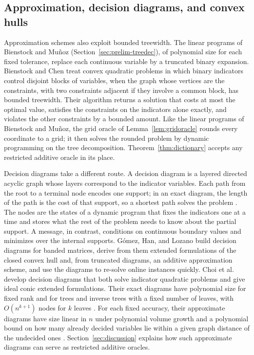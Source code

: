 \subsection{Approximation, decision diagrams, and convex hulls}
Approximation schemes also exploit bounded treewidth. The linear
programs of Bienstock and Mu\~noz \cite{BienstockMunoz}
(Section~\ref{sec:prelim-treedec}), of polynomial size for each fixed
tolerance, replace each continuous variable by a truncated binary
expansion. Bienstock and Chen \cite[Theorem~1.4]{BienstockChen} treat
convex quadratic problems in which binary indicators control disjoint
blocks of variables, when the graph whose vertices are the constraints,
with two constraints adjacent if they involve a common block, has
bounded treewidth. Their algorithm returns a solution that costs at
most the optimal value, satisfies the constraints on the indicators
alone exactly, and violates the other constraints by a bounded amount.
Like the linear programs of Bienstock and Mu\~noz, the grid oracle of
Lemma~\ref{lem:gridoracle} rounds every coordinate to a grid; it then
solves the rounded problem by dynamic programming on the tree
decomposition.
Theorem~\ref{thm:dictionary} accepts any restricted additive oracle in
its place.

Decision diagrams take a different route. A decision diagram is a
layered directed acyclic graph whose layers correspond to the indicator
variables. Each path from the root to a terminal node encodes one
support; in an exact diagram, the length of the path is the cost of that
support, so a shortest path solves the problem
\cite[Section~2.1]{GomezBanded}. The nodes are the states of a dynamic
program that fixes the indicators one at a time and stores what the rest
of the problem needs to know about the partial support. A message, in
contrast, conditions on continuous boundary values and minimizes over
the internal supports. G\'omez, Han, and Lozano \cite{GomezBanded} build
decision diagrams for banded matrices, derive from them extended
formulations of the closed convex hull and, from truncated diagrams, an
additive approximation scheme, and use the diagrams to re-solve online
instances quickly. Choi et al.\ \cite{ChoiDiagrams} develop decision
diagrams that both solve indicator quadratic problems and give ideal
conic extended formulations. Their exact diagrams have polynomial size
for fixed rank and for trees and inverse trees with a fixed number of
leaves, with $O(n^{k+1})$ nodes for $k$ leaves
\cite[Section~7]{ChoiDiagrams}. For each fixed accuracy, their
approximate diagrams have size linear in $n$ under polynomial volume
growth and a polynomial bound on how many already decided variables lie
within a given graph distance of the undecided ones
\cite[Definition~15 and Theorem~4]{ChoiDiagrams}.
Section~\ref{sec:discussion} explains how such approximate diagrams can
serve as restricted additive oracles.

